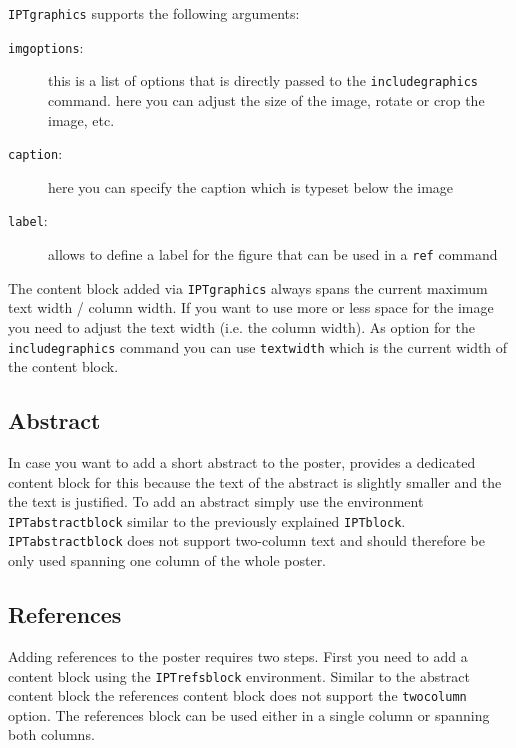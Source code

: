 \texttt{IPTgraphics} supports the following arguments:
\begin{description}
	\item[\texttt{imgoptions}:] this is a list of options that is directly passed to the \texttt{\bs{}includegraphics} command. here you can adjust the size of the image, rotate or crop the image, etc.
	\item[\texttt{caption}:] here you can specify the caption which is typeset below the image
	\item[\texttt{label}:] allows to define a label for the figure that can be used in a \texttt{\bs{}ref} command
\end{description}

The content block added via \texttt{IPTgraphics} always spans the current maximum text width / column width. If you want to use more or less space for the image you need to adjust the text width (i.e. the column width). As option for the \texttt{includegraphics} command you can use \texttt{\bs{}textwidth} which is the current width of the content block.


\subsection{Abstract}

In case you want to add a short abstract to the poster, \tugPoster provides a dedicated content block for this because the text of the abstract is slightly smaller and the the text is justified. To add an abstract simply use the environment \texttt{IPTabstractblock} similar to the previously explained \texttt{IPTblock}. \texttt{IPTabstractblock} does not support two-column text and should therefore be only used spanning one column of the whole poster.



\subsection{References}

Adding references to the poster requires two steps. First you need to add a content block using the \texttt{IPTrefsblock} environment. Similar to the abstract content block the references content block does not support the \texttt{twocolumn} option. The references block can be used either in a single column or spanning both columns.

